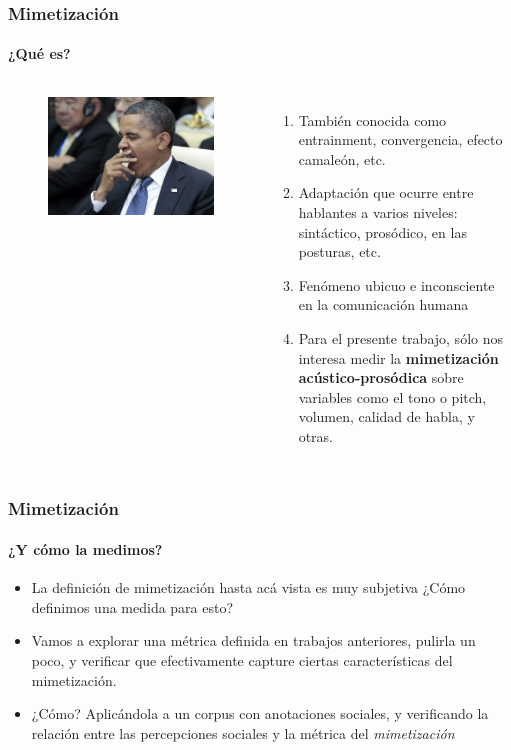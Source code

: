 \begin{frame}
  \frametitle{Mimetización}
  \framesubtitle{¿Qué es?}
  \begin{columns}
    \begin{figure}
      \includegraphics[width=\textwidth]{images/bostezo.jpg}
    \end{figure}

  \begin{enumerate}
    \item También conocida como entrainment, convergencia, efecto camaleón, etc.
    \item Adaptación que ocurre entre hablantes a varios niveles: sintáctico, prosódico, en las posturas, etc.
    \item Fenómeno ubicuo e inconsciente en la comunicación humana
    \item Para el presente trabajo, sólo nos interesa medir la \textbf{mimetización acústico-prosódica} sobre variables como el tono o pitch, volumen, calidad de habla, y otras.

  \end{enumerate}

  \end{columns}

\end{frame}

\begin{frame}
  \frametitle{Mimetización}
  \framesubtitle{¿Y cómo la medimos?}

  \begin{itemize}
    \item La definición de mimetización hasta acá vista es muy subjetiva ¿Cómo definimos una medida para esto?
    \item Vamos a explorar una métrica definida en trabajos anteriores, pulirla un poco, y verificar que efectivamente capture ciertas características del mimetización.
    \item ¿Cómo? Aplicándola a un corpus con anotaciones sociales, y verificando la relación entre las percepciones sociales y la métrica del \emph{mimetización}
  \end{itemize}


\end{frame}
